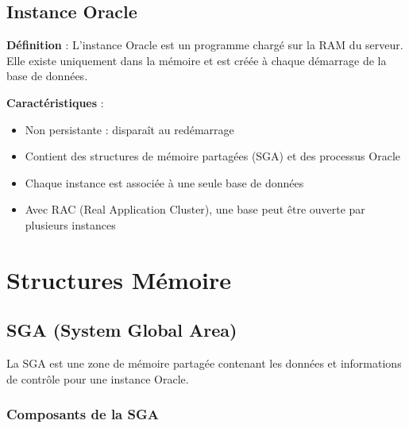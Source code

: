 \documentclass[12pt,a4paper]{article}
\begin{document}
\subsection{Instance Oracle}

\textbf{Définition} : L'instance Oracle est un programme chargé sur la RAM du serveur. Elle existe uniquement dans la mémoire et est créée à chaque démarrage de la base de données.

\textbf{Caractéristiques} :
\begin{itemize}
    \item Non persistante : disparaît au redémarrage
    \item Contient des structures de mémoire partagées (SGA) et des processus Oracle
    \item Chaque instance est associée à une seule base de données
    \item Avec RAC (Real Application Cluster), une base peut être ouverte par plusieurs instances
\end{itemize}

\section{Structures Mémoire}

\subsection{SGA (System Global Area)}

La SGA est une zone de mémoire partagée contenant les données et informations de contrôle pour une instance Oracle.

\subsubsection{Composants de la SGA}
\end{document}
